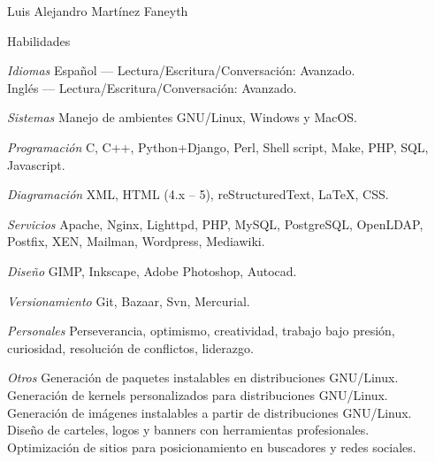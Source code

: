 \documentclass[11pt,letterpaper]{article}
\begin{document}
\begin{cv}{Luis Alejandro Mart\'inez Faneyth}
\begin{cvlist}{Habilidades}
\item[\textit{\large{Idiomas}}]{
	Espa\~nol --- Lectura/Escritura/Conversaci\'on: Avanzado.\\
	Ingl\'es --- Lectura/Escritura/Conversaci\'on: Avanzado.
}
\item[\textit{\large{Sistemas}}]{Manejo de ambientes GNU/Linux, Windows y MacOS.}
\item[\textit{\large{Programaci\'on}}]{C, C++, Python+Django, Perl, Shell script, Make, PHP, SQL, Javascript.}
\item[\textit{\large{Diagramaci\'on}}]{XML, HTML (4.x -- 5), reStructuredText, \LaTeX, CSS.}
\item[\textit{\large{Servicios}}]{Apache, Nginx, Lighttpd, PHP, MySQL, PostgreSQL, OpenLDAP, Postfix, XEN, Mailman, Wordpress, Mediawiki.}
\item[\textit{\large{Dise\~no}}]{GIMP, Inkscape, Adobe Photoshop, Autocad.}
\item[\textit{\large{Versionamiento}}]{Git, Bazaar, Svn, Mercurial.}
\item[\textit{\large{Personales}}]{Perseverancia, optimismo, creatividad, trabajo bajo presi\'on, curiosidad, resoluci\'on de conflictos, liderazgo.}
\item[\textit{\large{Otros}}]{
	Generaci\'on de paquetes instalables en distribuciones GNU/Linux.\\
	Generaci\'on de kernels personalizados para distribuciones GNU/Linux.\\
	Generaci\'on de im\'agenes instalables a partir de distribuciones GNU/Linux.\\
	Dise\~no de carteles, logos y banners con herramientas profesionales.\\
	Optimizaci\'on de sitios para posicionamiento en buscadores y redes sociales.
}
\end{cvlist}

\end{cv}
\end{document}
